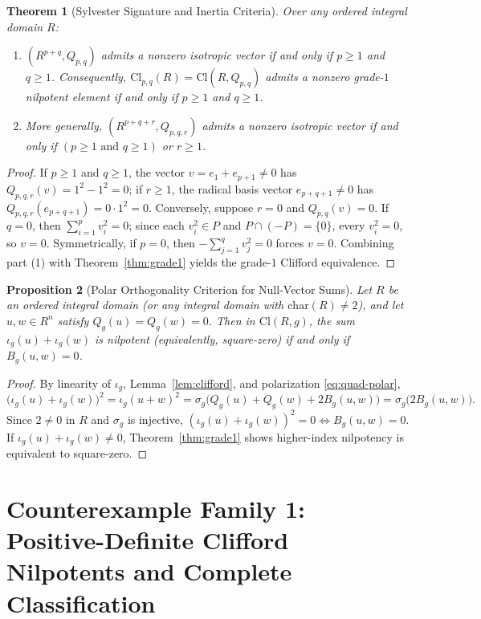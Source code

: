 \documentclass[11pt]{article}
\newtheorem{theorem}{Theorem}[section]
\newtheorem{proposition}[theorem]{Proposition}
\theoremstyle{definition}
\newcommand{\Cl}{\mathrm{Cl}}
\begin{document}
\begin{theorem}[Sylvester Signature and Inertia Criteria]\label{thm:signature}
Over any ordered integral domain $R$:
\begin{enumerate}
  \item $(R^{p+q}, Q_{p,q})$ admits a nonzero isotropic vector if and only if $p \ge 1$
    and $q \ge 1$. Consequently, $\Cl_{p,q}(R) = \Cl(R, Q_{p,q})$ admits a nonzero
    \emph{grade-$1$} nilpotent element if and only if $p \ge 1$ and $q \ge 1$.
  \item More generally, $(R^{p+q+r}, Q_{p,q,r})$ admits a nonzero isotropic vector if and
    only if $(p \ge 1 \text{ and } q \ge 1)$ or $r \ge 1$.
\end{enumerate}
\end{theorem}
\begin{proof}
If $p \ge 1$ and $q \ge 1$, the vector $v = e_1 + e_{p+1} \ne 0$ has $Q_{p,q,r}(v) = 1^2 - 1^2 = 0$;
if $r \ge 1$, the radical basis vector $e_{p+q+1} \ne 0$ has $Q_{p,q,r}(e_{p+q+1}) = 0 \cdot 1^2 = 0$.
Conversely, suppose $r = 0$ and $Q_{p,q}(v) = 0$. If $q = 0$, then $\sum_{i=1}^p v_i^2 = 0$;
since each $v_i^2 \in P$ and $P \cap (-P) = \{0\}$, every $v_i^2 = 0$, so $v = 0$.
Symmetrically, if $p = 0$, then $-\sum_{j=1}^q v_j^2 = 0$ forces $v = 0$. Combining part
(1) with Theorem~\ref{thm:grade1} yields the grade-$1$ Clifford equivalence.
\end{proof}

\begin{proposition}[Polar Orthogonality Criterion for Null-Vector Sums]\label{prop:polar}
Let $R$ be an ordered integral domain (or any integral domain with $\mathrm{char}(R) \ne 2$),
and let $u, w \in R^n$ satisfy $Q_g(u) = Q_g(w) = 0$. Then in $\Cl(R, g)$, the sum
$\iota_g(u) + \iota_g(w)$ is nilpotent (equivalently, square-zero) if and only if
$B_g(u, w) = 0$.
\end{proposition}
\begin{proof}
By linearity of $\iota_g$, Lemma~\ref{lem:clifford}, and polarization \eqref{eq:quad-polar},
\[
  \bigl(\iota_g(u) + \iota_g(w)\bigr)^2
  = \iota_g(u + w)^2
  = \sigma_g\bigl(Q_g(u) + Q_g(w) + 2 B_g(u, w)\bigr)
  = \sigma_g\bigl(2 B_g(u, w)\bigr).
\]
Since $2 \ne 0$ in $R$ and $\sigma_g$ is injective, $(\iota_g(u) + \iota_g(w))^2 = 0 \iff B_g(u, w) = 0$.
If $\iota_g(u) + \iota_g(w) \ne 0$, Theorem~\ref{thm:grade1} shows higher-index nilpotency
is equivalent to square-zero.
\end{proof}

\section{Counterexample Family 1: Positive-Definite Clifford Nilpotents and Complete Classification}
\end{document}
